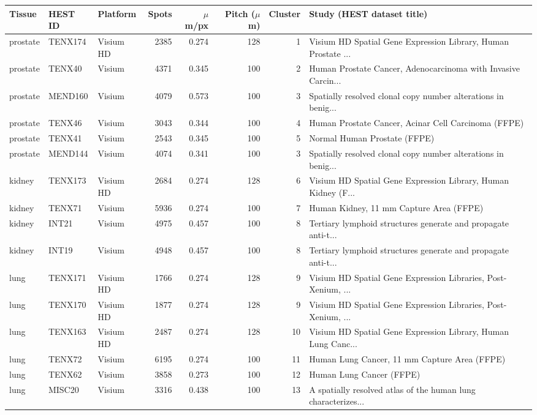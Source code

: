 \begin{tabular}{lllrrrrl}
\toprule
Tissue & HEST ID & Platform & Spots & $\mu$m/px & Pitch ($\mu$m) & Cluster & Study (HEST dataset title) \\
\midrule
prostate & TENX174 & Visium HD & 2385 & 0.274 & 128 & 1 & Visium HD Spatial Gene Expression Library, Human Prostate ... \\
prostate & TENX40 & Visium & 4371 & 0.345 & 100 & 2 & Human Prostate Cancer, Adenocarcinoma with Invasive Carcin... \\
prostate & MEND160 & Visium & 4079 & 0.573 & 100 & 3 & Spatially resolved clonal copy number alterations in benig... \\
prostate & TENX46 & Visium & 3043 & 0.344 & 100 & 4 & Human Prostate Cancer, Acinar Cell Carcinoma (FFPE) \\
prostate & TENX41 & Visium & 2543 & 0.345 & 100 & 5 & Normal Human Prostate (FFPE) \\
prostate & MEND144 & Visium & 4074 & 0.341 & 100 & 3 & Spatially resolved clonal copy number alterations in benig... \\
kidney & TENX173 & Visium HD & 2684 & 0.274 & 128 & 6 & Visium HD Spatial Gene Expression Library, Human Kidney (F... \\
kidney & TENX71 & Visium & 5936 & 0.274 & 100 & 7 & Human Kidney, 11 mm Capture Area (FFPE) \\
kidney & INT21 & Visium & 4975 & 0.457 & 100 & 8 & Tertiary lymphoid structures generate and propagate anti-t... \\
kidney & INT19 & Visium & 4948 & 0.457 & 100 & 8 & Tertiary lymphoid structures generate and propagate anti-t... \\
lung & TENX171 & Visium HD & 1766 & 0.274 & 128 & 9 & Visium HD Spatial Gene Expression Libraries, Post-Xenium, ... \\
lung & TENX170 & Visium HD & 1877 & 0.274 & 128 & 9 & Visium HD Spatial Gene Expression Libraries, Post-Xenium, ... \\
lung & TENX163 & Visium HD & 2487 & 0.274 & 128 & 10 & Visium HD Spatial Gene Expression Library, Human Lung Canc... \\
lung & TENX72 & Visium & 6195 & 0.274 & 100 & 11 & Human Lung Cancer, 11 mm Capture Area (FFPE) \\
lung & TENX62 & Visium & 3858 & 0.273 & 100 & 12 & Human Lung Cancer (FFPE) \\
lung & MISC20 & Visium & 3316 & 0.438 & 100 & 13 & A spatially resolved atlas of the human lung characterizes... \\

\end{tabular}
